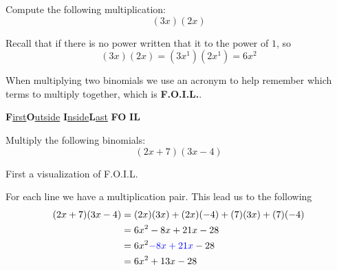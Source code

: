 \begin{exercise}
Compute the following multiplication:
\[
(3x)(2x)
\]
\end{exercise}
\begin{solution}[2in]
Recall that if there is no power written that it to the power of $1$, so
\[
(3x)(2x)=(3x^1)(2x^1)=6x^2
\]
\end{solution}
\vspace{0.5em}

\begin{definition}
When multiplying two binomials we use an acronym to help remember which terms
to multiply together, which is \textbf{F.O.I.L.}.
\begin{center}
\ifprintanswers
\textbf{F}\underline{irst}\quad\textbf{O}\underline{utside}
\quad\textbf{I}\underline{nside}\quad\textbf{L}\underline{ast}
\else
\textbf{F}\underline{\phantom{========}}\quad\textbf{O}\underline{\phantom{========}}
\quad\textbf{I}\underline{\phantom{========}}\quad\textbf{L}\underline{\phantom{========}}
\fi
\end{center}
\end{definition}
\vspace{0.5em}

\begin{exercise}
Multiply the following binomials:
\[
(2x+7)(3x-4)
\]
\end{exercise}
\begin{solution}[2in]
First a visualization of F.O.I.L.
\begin{center}
\end{center}
For each line we have a multiplication pair. This lead us to the following
\begin{align*}
(2x+7)(3x-4)&=(2x)(3x)+(2x)(-4)+(7)(3x)+(7)(-4)\\
&=6x^2-8x+21x-28\\
&=6x^2{\color{blue}-8x+21x}-28\\
&=6x^2+13x-28
\end{align*}
\end{solution}
\vspace{0.5em}

